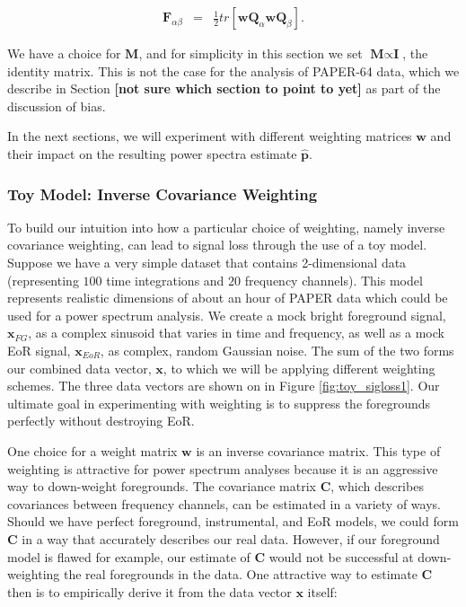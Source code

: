 \documentclass[preprint2,numberedappendix,tighten,twocolappendix]{aastex6}  %
\newcommand{\cc}[1]{{\color{purple} \textbf{[#1]}}}
\begin{document}
\begin{eqnarray}
\textbf{F}_{\alpha\beta} &=& \frac{1}{2}tr[\textbf{w}\textbf{Q}_{\alpha}\textbf{w}\textbf{Q}_{\beta}]. 
\end{eqnarray}

We have a choice for $\textbf{M}$, and for simplicity in this section we set $\textbf{M} \propto \textbf{I}$, the identity matrix. This is not the case for the analysis of PAPER-64 data, which we describe in Section \cc{not sure which section to point to yet} as part of the discussion of bias. 

In the next sections, we will experiment with different weighting matrices $\textbf{w}$ and their impact on the resulting power spectra estimate $\hat{\textbf{p}}$.

\subsubsection{Toy Model: Inverse Covariance Weighting}

To build our intuition into how a particular choice of weighting, namely inverse covariance weighting, can lead to signal loss through the use of a toy model. Suppose we have a very simple dataset that contains 2-dimensional data (representing $100$ time integrations and $20$ frequency channels). This model represents realistic dimensions of about an hour of PAPER data which could be used for a power spectrum analysis. We create a mock bright foreground signal, $\textbf{x}_{FG}$, as a complex sinusoid that varies in time and frequency, as well as a mock EoR signal, $\textbf{x}_{EoR}$, as complex, random Gaussian noise. The sum of the two forms our combined data vector, $\textbf{x}$, to which we will be applying different weighting schemes. The three data vectors are shown on in Figure \ref{fig:toy_sigloss1}. Our ultimate goal in experimenting with weighting is to suppress the foregrounds perfectly without destroying EoR.

One choice for a weight matrix $\textbf{w}$ is an inverse covariance matrix. This type of weighting is attractive for power spectrum analyses because it is an aggressive way to down-weight foregrounds. The covariance matrix $\textbf{C}$, which describes covariances between frequency channels, can be estimated in a variety of ways. Should we have perfect foreground, instrumental, and EoR models, we could form $\textbf{C}$ in a way that accurately describes our real data. However, if our foreground model is flawed for example, our estimate of $\textbf{C}$ would not be successful at down-weighting the real foregrounds in the data. One attractive way to estimate $\textbf{C}$ then is to empirically derive it from the data vector $\textbf{x}$ itself:
\end{document}
